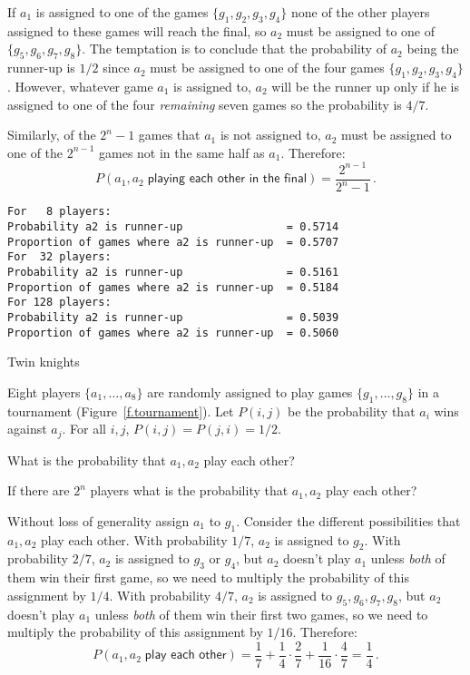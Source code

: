 \solution{}

If $a_1$ is assigned to one of the games $\{g_1,g_2,g_3,g_4\}$ none of the other players assigned to these games will reach the final, so $a_2$ must be assigned to one of $\{g_5,g_6,g_7,g_8\}$. The temptation is to conclude that the probability of $a_2$ being the runner-up is $1/2$ since $a_2$ must be assigned to one of the four games $\{g_1,g_2,g_3,g_4\}$. However, whatever game $a_1$ is  assigned to, $a_2$ will be the runner up only if he is assigned to one of the four \emph{remaining} seven games so the probability is $4/7$.

 Similarly, of the $2^n-1$ games that $a_1$ is not assigned to, $a_2$ must be assigned to one of the $2^{n-1}$ games not in the same half as $a_1$. Therefore:
\[
P(a_1,a_2\;\textsf{playing each other in the final})=\frac{2^{n-1}}{2^n-1}\,.
\]

\newpage

\sml{}
\begin{verbatim}
For   8 players:
Probability a2 is runner-up                = 0.5714
Proportion of games where a2 is runner-up  = 0.5707
For  32 players:
Probability a2 is runner-up                = 0.5161
Proportion of games where a2 is runner-up  = 0.5184
For 128 players:
Probability a2 is runner-up                = 0.5039
Proportion of games where a2 is runner-up  = 0.5060
\end{verbatim}


\begin{prob}{Twin knights}

Eight players $\{a_1,\ldots,a_8\}$ are randomly assigned to play games $\{g_1,\ldots,g_8\}$ in a tournament (Figure~\ref{f.tournament}). Let $P(i,j)$ be the probability that $a_i$ wins against $a_j$. For all $i,j$, $P(i,j)=P(j,i)=1/2$.

 What is the probability that $a_1,a_2$ play each other?

 If there are $2^n$ players what is the probability that $a_1,a_2$ play each other?
\end{prob}

\solution{}

 Without loss of generality assign $a_1$ to $g_1$. Consider the different possibilities that $a_1,a_2$ play each other. With probability $1/7$, $a_2$ is assigned to $g_2$. With probability $2/7$, $a_2$ is assigned to $g_3$ or $g_4$, but $a_2$ doesn't play $a_1$ unless \emph{both} of them win their first game, so we need to multiply the probability of this assignment by $1/4$. With probability $4/7$, $a_2$ is assigned to $g_5,g_6,g_7,g_8$, but $a_2$ doesn't play $a_1$ unless \emph{both} of them win their first two  games, so we need to multiply the probability of this assignment by $1/16$. Therefore:
\[
P(a_1, a_2\;\textsf{play each other})=\frac{1}{7} + \frac{1}{4}\cdot \frac{2}{7} + \frac{1}{16}\cdot \frac{4}{7} =\frac{1}{4}\,.
\]

